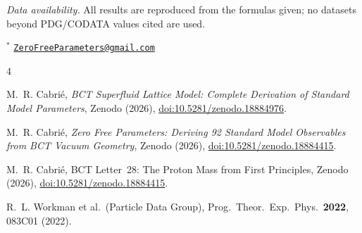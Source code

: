\documentclass[10pt,twocolumn]{article}
\begin{document}
\smallskip
\noindent\textit{Data availability.} All results are reproduced from the formulas given; no
datasets beyond PDG/CODATA values cited are used.

\bigskip
\noindent$^*$ \href{mailto:ZeroFreeParameters@gmail.com}{\texttt{ZeroFreeParameters@gmail.com}}

\begin{thebibliography}{4}

M.~R. Cabri\'{e}, \textit{BCT Superfluid Lattice Model: Complete Derivation of Standard Model
Parameters}, Zenodo (2026),
\href{https://doi.org/10.5281/zenodo.18884976}{doi:10.5281/zenodo.18884976}.

M.~R. Cabri\'{e}, \textit{Zero Free Parameters: Deriving 92 Standard Model Observables from
BCT Vacuum Geometry}, Zenodo (2026),
\href{https://doi.org/10.5281/zenodo.18884415}{doi:10.5281/zenodo.18884415}.

M.~R. Cabri\'{e}, BCT Letter~28: The Proton Mass from First Principles, Zenodo (2026),
\href{https://doi.org/10.5281/zenodo.18884415}{doi:10.5281/zenodo.18884415}.

R.~L. Workman et al.\ (Particle Data Group), Prog.\ Theor.\ Exp.\ Phys.\ \textbf{2022},
083C01 (2022).

\end{thebibliography}
\end{document}
